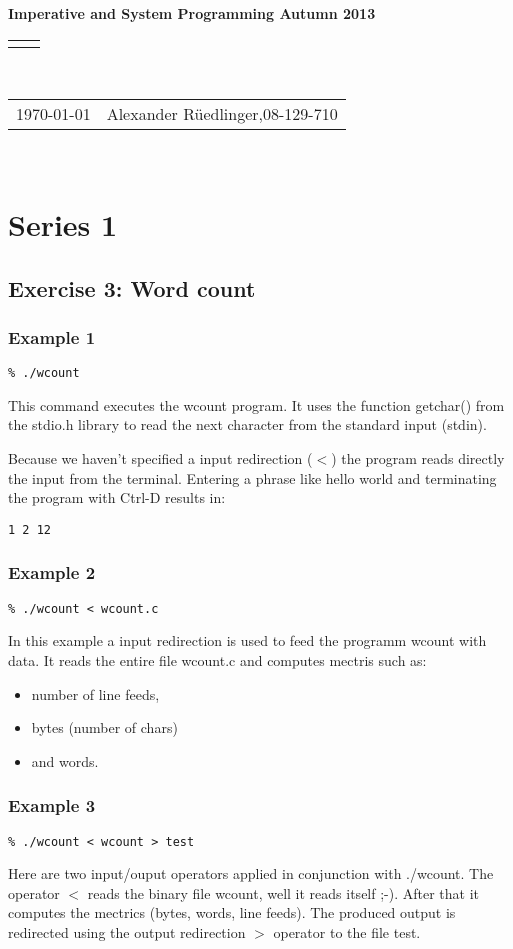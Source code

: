 \documentclass[12pt]{article}
\renewcommand{\title}[1]{\textbf{#1}\\}
\renewcommand{\line}{\begin{tabularx}{\textwidth}{X>{\raggedleft}X}\hline\\\end{tabularx}\\[-0.5cm]}
\newcommand{\leftright}[2]{\begin{tabularx}{\textwidth}{X>{\raggedleft}X}#1%
& #2\\\end{tabularx}\\[-0.5cm]}
\begin{document}
\title{Imperative and System Programming Autumn 2013}
\line
\leftright{\today}{Alexander Rüedlinger,08-129-710} %
\section*{Series 1}
\subsection*{Exercise 3: Word count}
\subsubsection*{Example 1}
\begin{lstlisting}
% ./wcount
\end{lstlisting}
This command executes the wcount program. It uses the function getchar() from the stdio.h library to read the next character from the standard input (stdin).  
   
Because we haven't specified a input redirection ($<$) the program reads directly the input from the terminal. 
Entering a phrase like hello world and terminating the program with Ctrl-D results in:
\begin{lstlisting}
1 2 12
\end{lstlisting}

\subsubsection*{Example 2}
\begin{lstlisting}
% ./wcount < wcount.c
\end{lstlisting}
In this example a input redirection is used to feed the programm wcount with data.  
It reads the entire file wcount.c and computes mectris such as:
\begin{itemize}
	\item number of line feeds,
	\item bytes (number of chars) 
	\item and words.
\end{itemize}

\subsubsection*{Example 3}
\begin{lstlisting}
% ./wcount < wcount > test
\end{lstlisting}
Here are two input/ouput operators applied in conjunction with ./wcount.  
The operator $<$ reads the binary file wcount, well it reads itself ;-).  
After that it computes the mectrics (bytes, words, line feeds). 
The produced output is redirected using the output redirection $>$ operator to the file test. 
\end{document}
